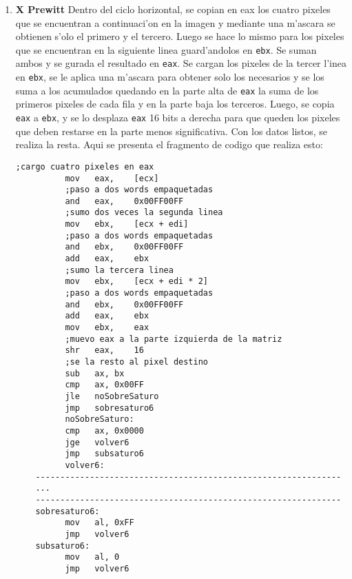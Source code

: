 \documentclass[11pt]{article}
\begin{document}
\begin{enumerate}
\item \textbf{X Prewitt}
\subitem Dentro del ciclo horizontal, se copian en eax los cuatro pixeles que se encuentran a continuaci'on en la imagen y mediante una m'ascara se obtienen s'olo el primero y el tercero. Luego se hace lo mismo para los pixeles que se encuentran en la siguiente linea guard'andolos en \verb'ebx'. Se suman ambos y se gurada el resultado en \verb'eax'.
Se cargan los pixeles de la tercer l'inea en \verb'ebx', se le aplica una m'ascara para obtener solo los necesarios y se los suma a los acumulados quedando en la parte alta de \verb'eax' la suma de los primeros pixeles de cada fila y en la parte baja los terceros. Luego, se copia  \verb'eax' a \verb'ebx', y se lo desplaza \verb'eax' 16 bits a derecha para que queden los pixeles que deben restarse en la parte menos significativa.
Con los datos listos, se realiza la resta. Aqui se presenta el fragmento de codigo que realiza esto:
\begin{lstlisting}[frame=single]
	      ;cargo cuatro pixeles en eax
	      mov	eax,	[ecx]	
	      ;paso a dos words empaquetadas
	      and	eax,	0x00FF00FF	
	      ;sumo dos veces la segunda linea
	      mov	ebx,	[ecx + edi]	
	      ;paso a dos words empaquetadas
	      and	ebx,	0x00FF00FF	
	      add	eax,	ebx
	      ;sumo la tercera linea
	      mov	ebx,	[ecx + edi * 2]	
	      ;paso a dos words empaquetadas
	      and	ebx,	0x00FF00FF	
	      add	eax,	ebx
	      mov	ebx,	eax
	      ;muevo eax a la parte izquierda de la matriz
	      shr	eax,	16	
	      ;se la resto al pixel destino
	      sub	ax,	bx	
	      cmp	ax,	0x00FF
	      jle	noSobreSaturo
	      jmp	sobresaturo6
	      noSobreSaturo:
	      cmp	ax,	0x0000
	      jge	volver6
	      jmp	subsaturo6
	      volver6:
	--------------------------------------------------------------
	...
	--------------------------------------------------------------
	sobresaturo6:
	      mov	al,	0xFF
	      jmp	volver6
	subsaturo6:
	      mov	al,	0
	      jmp	volver6


\end{lstlisting}
\end{enumerate}
\end{document}
